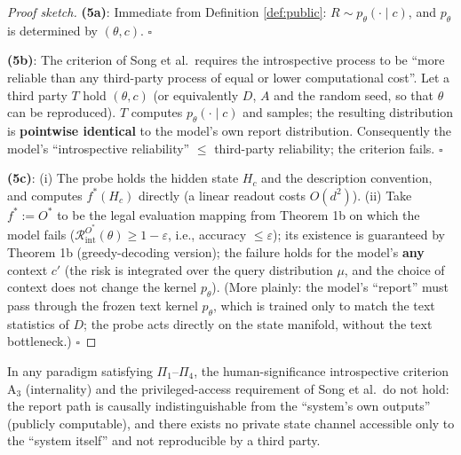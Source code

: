\begin{proof}[Proof sketch]
\textbf{(5a)}: Immediate from Definition \ref{def:public}: $R \sim p_\theta(\cdot\mid c)$,
and $p_\theta$ is determined by $(\theta, c)$. $\square$

\textbf{(5b)}: The criterion of Song et al.\ requires the introspective process to be ``more
reliable than any third-party process of equal or lower computational cost''. Let a third party
$T$ hold $(\theta, c)$ (or equivalently $D$, $A$ and the random seed, so that $\theta$ can be
reproduced). $T$ computes $p_\theta(\cdot\mid c)$ and samples; the resulting distribution
is \textbf{pointwise identical} to the model's own report distribution. Consequently the
model's
``introspective reliability'' $\le$ third-party reliability; the criterion fails. $\square$

\textbf{(5c)}: (i) The probe holds the hidden state $H_c$ and the description convention, and
computes $f^{*}(H_c)$ directly (a linear readout costs $O(d^2)$). (ii) Take
$f^{*} := O^{*}$ to be the legal evaluation mapping from Theorem 1b on which the model fails
($\mathcal{R}_{\mathrm{int}}^{O^{*}}(\theta) \ge 1-\varepsilon$, i.e., accuracy
$\le \varepsilon$); its existence is guaranteed by Theorem 1b (greedy-decoding version);
the failure holds for the model's \textbf{any} context $c'$ (the risk is integrated over the
query distribution $\mu$, and the choice of context does not change the kernel $p_\theta$).
(More plainly: the model's ``report'' must pass through the frozen text kernel $p_\theta$, which
is trained only to match the text statistics of $D$; the probe acts directly on the state
manifold, without the text bottleneck.) $\square$
\end{proof}

\begin{corollary}\label{cor:a3}
In any paradigm satisfying $\Pi_1$--$\Pi_4$, the human-significance introspective criterion
$\mathrm{A}_3$ (internality) and the privileged-access requirement of Song et al.\ do not
hold: the report path is causally indistinguishable from the ``system's own outputs'' (publicly
computable), and there exists no private state channel accessible only to the ``system itself''
and not reproducible by a third party.
\end{corollary}

